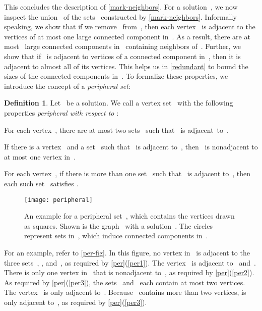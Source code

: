 \documentclass[12pt, a4paper, abstracton]{scrreprt}
\newcounter{theorem}
\theoremstyle{definition}
\newtheorem{definition}{Definition}[chapter]
\theoremstyle{remark}
\begin{document}
\noindent This concludes the description of \autoref{mark-neighbors}.  For a solution~, we now inspect the union~ of the sets~ constructed by \autoref{mark-neighbors}. Informally speaking, we show that if we remove~ from~, then each vertex~ is adjacent to the vertices of at most one large connected component in~. As a result, there are at most~ large connected components in~ containing neighbors of~.  Further, we show that if~ is adjacent to vertices of a connected component in~, then it is adjacent to almost all of its vertices. This helps us in \autoref{redundant} to bound the sizes of the connected components in~. To formalize these properties, we introduce the concept of a \emph{peripheral set}:

\begin{definition}\label{per} 
  Let~ be a solution. We call a vertex set~ with the following properties \emph{peripheral with respect to }:
  \begin{compactenum}
  \item\label{per1} For each vertex~, there are at most two sets~ such that~ is adjacent~to~.
  \item\label{per2} If there is a vertex~ and a set~ such that~ is adjacent to~, then~ is nonadjacent to at most one vertex in~.
  \item\label{per3} For each vertex~, if there is more than one set~ such that~ is adjacent to~, then each such set~ satisfies .
  \end{compactenum}
\end{definition}

\begin{figure}[t]
  \centering
  \texttt{[image: peripheral]}
  \caption{An example for a peripheral set~, which contains the vertices drawn as squares. Shown is the graph~ with a solution~. The circles represent sets in~, which induce connected components in~.
  \label{per-fig}}
\end{figure}

\noindent For an example, refer to \autoref{per-fig}.  In this figure, no vertex in~ is adjacent to the three sets~, , and~, as required by \autoref{per}(\ref{per1}). The vertex~ is adjacent to~ and~. There is only one vertex in~ that is nonadjacent to~, as required by \autoref{per}(\ref{per2}). As required by \autoref{per}(\ref{per3}), the sets~ and~ each contain at most two vertices. The vertex~ is only adjacent to~. Because~ contains more than two vertices,  is only adjacent to~, as required by \autoref{per}(\ref{per3}).
\end{document}
